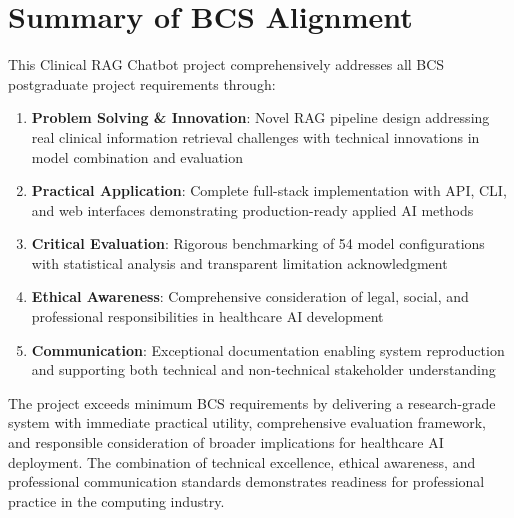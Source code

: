 \section{Summary of BCS Alignment}

This Clinical RAG Chatbot project comprehensively addresses all BCS postgraduate project requirements through:

\begin{enumerate}
    \item \textbf{Problem Solving \& Innovation}: Novel RAG pipeline design addressing real clinical information retrieval challenges with technical innovations in model combination and evaluation
    
    \item \textbf{Practical Application}: Complete full-stack implementation with API, CLI, and web interfaces demonstrating production-ready applied AI methods
    
    \item \textbf{Critical Evaluation}: Rigorous benchmarking of 54 model configurations with statistical analysis and transparent limitation acknowledgment
    
    \item \textbf{Ethical Awareness}: Comprehensive consideration of legal, social, and professional responsibilities in healthcare AI development
    
    \item \textbf{Communication}: Exceptional documentation enabling system reproduction and supporting both technical and non-technical stakeholder understanding
\end{enumerate}

The project exceeds minimum BCS requirements by delivering a research-grade system with immediate practical utility, comprehensive evaluation framework, and responsible consideration of broader implications for healthcare AI deployment. The combination of technical excellence, ethical awareness, and professional communication standards demonstrates readiness for professional practice in the computing industry.